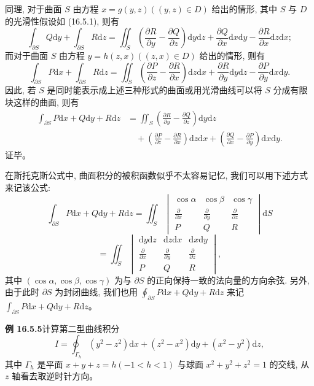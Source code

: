 \documentclass[UTF8,12pt,a4paper,fontset=fandol]{ctexart}
\begin{document}
同理, 对于曲面 $S$ 由方程 $x=g(y,z)((y,z)\in D)$ 给出的情形, 其中 $S$ 与 $D$ 的光滑性假设如 (16.5.1), 则有
\[
  \int_{\partial S}Q\mathrm dy+\int_{\partial S}R\mathrm dz
  =\iint_S\left(\frac{\partial R}{\partial y}-\frac{\partial Q}{\partial z}\right)\mathrm dy\mathrm dz
    +\frac{\partial Q}{\partial x}\mathrm dx\mathrm dy-\frac{\partial R}{\partial x}\mathrm dz\mathrm dx;
\]
而对于曲面 $S$ 由方程 $y=h(z,x)((z,x)\in D)$ 给出的情形, 则有
\[
  \int_{\partial S}P\mathrm dx+\int_{\partial S}R\mathrm dz
  =\iint_S\left(\frac{\partial P}{\partial z}-\frac{\partial R}{\partial x}\right)\mathrm dz\mathrm dx
    +\frac{\partial R}{\partial y}\mathrm dy\mathrm dz-\frac{\partial P}{\partial y}\mathrm dx\mathrm dy.
\]
因此, 若 $S$ 是同时能表示成上述三种形式的曲面或用光滑曲线可以将 $S$ 分成有限块这样的曲面, 则有
\[
\begin{aligned}
  \int_{\partial S}P\mathrm dx+Q\mathrm dy+R\mathrm dz
  &=\iint_S\left(\frac{\partial R}{\partial y}-\frac{\partial Q}{\partial z}\right)\mathrm dy\mathrm dz\\
  &\quad+\left(\frac{\partial P}{\partial z}-\frac{\partial R}{\partial x}\right)\mathrm dz\mathrm dx
    +\left(\frac{\partial Q}{\partial x}-\frac{\partial P}{\partial y}\right)\mathrm dx\mathrm dy.
\end{aligned}
\]
证毕。

在斯托克斯公式中, 曲面积分的被积函数似乎不太容易记忆, 我们可以用下述方式来记该公式:
\[
  \int_{\partial S}P\mathrm dx+Q\mathrm dy+R\mathrm dz
  =\iint_S
  \begin{vmatrix}
    \cos\alpha&\cos\beta&\cos\gamma\\
    \frac{\partial}{\partial x}&\frac{\partial}{\partial y}&\frac{\partial}{\partial z}\\
    P&Q&R
  \end{vmatrix}\mathrm dS
\]
\[
  =\iint_S
  \begin{vmatrix}
    \mathrm dy\mathrm dz&\mathrm dz\mathrm dx&\mathrm dx\mathrm dy\\
    \frac{\partial}{\partial x}&\frac{\partial}{\partial y}&\frac{\partial}{\partial z}\\
    P&Q&R
  \end{vmatrix},
\]
其中 $(\cos\alpha,\cos\beta,\cos\gamma)$ 为与 $\partial S$ 的正向保持一致的法向量的方向余弦. 另外, 由于此时 $\partial S$ 为封闭曲线, 我们也用 $\oint_{\partial S}P\mathrm dx+Q\mathrm dy+R\mathrm dz$ 来记 $\int_{\partial S}P\mathrm dx+Q\mathrm dy+R\mathrm dz$。

\noindent\textbf{例 16.5.5}\quad 计算第二型曲线积分
\[
  I=\oint_{\Gamma_h}(y^2-z^2)\mathrm dx+(z^2-x^2)\mathrm dy+(x^2-y^2)\mathrm dz,
\]
其中 $\Gamma_h$ 是平面 $x+y+z=h(-1<h<1)$ 与球面 $x^2+y^2+z^2=1$ 的交线, 从 $z$ 轴看去取逆时针方向。
\end{document}
